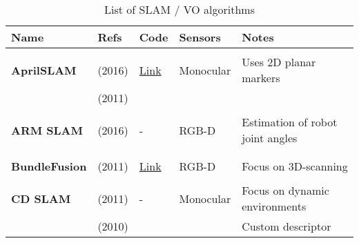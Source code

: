 \documentclass[a4paper,12pt]{scrartcl}
\begin{document}
{\footnotesize
\begin{longtable}{l|l|l|l|l}
  \caption{List of SLAM / VO algorithms}\\[2mm]
  \label{tab:list_found_slam_algorithms}
  \textbf{Name}            & \textbf{Refs}                     & \textbf{Code}                                                      & \textbf{Sensors}  & \textbf{Notes}\\
    \hline
    &                                   &                                                                    &                       &\\
    \textbf{AprilSLAM}     & \cite{Wang2016} (2016)            & \href{https://github.com/ProjectArtemis/aprilslam}{Link}           & Monocular             & Uses 2D planar markers\\
                           & \cite{Olson2011} (2011)           &                                                                    &                       &\\
                           &                                   &                                                                    &                       &\\
    \textbf{ARM SLAM}      & \cite{Klingensmith2016} (2016)    & -                                                                  & RGB-D                 & Estimation of robot joint angles\\
                           &                                   &                                                                    &                       &\\
                           &                                   &                                                                    &                       &\\
    \textbf{BundleFusion}  & \cite{Dai2017} (2011)             & {\href{https://github.com/niessner/BundleFusion}{Link}}            & RGB-D                 & Focus on 3D-scanning\\
                           &                                   &                                                                    &                       &\\
    \textbf{CD SLAM}       & \cite{Pirker2011} (2011)          & -                                                                  & Monocular             & Focus on dynamic environments\\
                           & \cite{Pirker2010} (2010)          &                                                                    &                       & Custom descriptor\\

\end{longtable}}
\end{document}
